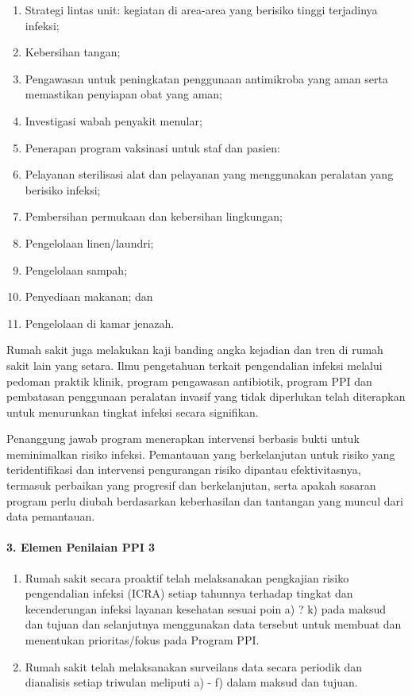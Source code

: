 \documentclass[
]{book}
\providecommand{\tightlist}{%
  \setlength{\itemsep}{0pt}\setlength{\parskip}{0pt}}
\begin{document}
\begin{enumerate}
\def\labelenumi{\alph{enumi}.}
\setcounter{enumi}{1}
\tightlist
\item
  Strategi lintas unit: kegiatan di area-area yang berisiko tinggi terjadinya infeksi;
\item
  Kebersihan tangan;
\item
  Pengawasan untuk peningkatan penggunaan antimikroba yang aman serta memastikan penyiapan obat yang aman;
\item
  Investigasi wabah penyakit menular;
\item
  Penerapan program vaksinasi untuk staf dan pasien:
\item
  Pelayanan sterilisasi alat dan pelayanan yang menggunakan peralatan yang berisiko infeksi;
\item
  Pembersihan permukaan dan kebersihan lingkungan;
\item
  Pengelolaan linen/laundri;
\item
  Pengelolaan sampah;
\item
  Penyediaan makanan; dan
\item
  Pengelolaan di kamar jenazah.
\end{enumerate}

Rumah sakit juga melakukan kaji banding angka kejadian dan tren di rumah sakit lain yang setara. Ilmu pengetahuan terkait pengendalian infeksi melalui pedoman praktik klinik, program pengawasan antibiotik, program PPI dan pembatasan penggunaan peralatan invasif yang tidak diperlukan telah diterapkan untuk menurunkan tingkat infeksi secara signifikan.

Penanggung jawab program menerapkan intervensi berbasis bukti untuk meminimalkan risiko infeksi. Pemantauan yang berkelanjutan untuk risiko yang teridentifikasi dan intervensi pengurangan risiko dipantau efektivitasnya, termasuk perbaikan yang progresif dan berkelanjutan, serta apakah sasaran program perlu diubah berdasarkan keberhasilan dan tantangan yang muncul dari data pemantauan.

\hypertarget{elemen-penilaian-ppi-3}{%
\paragraph*{3. Elemen Penilaian PPI 3}\label{elemen-penilaian-ppi-3}}

\begin{enumerate}
\def\labelenumi{\alph{enumi}.}
\tightlist
\item
  Rumah sakit secara proaktif telah melaksanakan pengkajian risiko pengendalian infeksi (ICRA) setiap tahunnya terhadap tingkat dan kecenderungan infeksi layanan kesehatan sesuai poin a) ? k) pada maksud dan tujuan dan selanjutnya menggunakan data tersebut untuk membuat dan menentukan prioritas/fokus pada Program PPI.
\item
  Rumah sakit telah melaksanakan surveilans data secara periodik dan dianalisis setiap triwulan meliputi a) - f) dalam maksud dan tujuan.
\end{enumerate}
\end{document}
